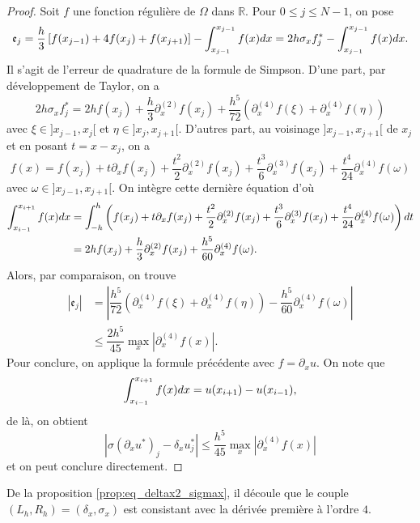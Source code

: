 \begin{itemize}
\begin{proof}
Soit $f$ une fonction régulière de $\Omega$ dans $\mathbb{R}$. Pour $0 \leq j \leq N-1$, on pose
\begin{equation}
\mathfrak{e}_j = \dfrac{h}{3} \left[ f(x_{j-1}) + 4 f(x_j) + f(x_{j+1}) \right] - \displaystyle\int_{x_{j-1}}^{x_{j-1}} f(x) dx = 2h \sigma_x f^*_j - \displaystyle\int_{x_{j-1}}^{x_{j-1}} f(x) dx.
\end{equation}
Il s'agit de l'erreur de quadrature de la formule de Simpson.
D'une part, par développement de Taylor, on a
\begin{equation}
2h \sigma_x f^*_j = 2h f(x_j) + \dfrac{h}{3}\partial_x^{(2)}f(x_j) + \dfrac{h^5}{72} \left( \partial_x^{(4)}f(\xi) + \partial_x^{(4)}f(\eta) \right) 
\end{equation}
avec $\xi \in ]x_{j-1}, x_j[$ et $\eta \in ]x_j, x_{j+1}[$.
D'autres part, au voisinage $]x_{j-1}, x_{j+1}[$ de $x_j$ et en posant $t=x-x_j$, on a 
\begin{equation}
f(x) = f(x_j) + t \partial_x f(x_j) + \dfrac{t^2}{2} \partial_x^{(2)} f(x_j) + \dfrac{t^3}{6} \partial_x^{(3)} f(x_j) + \dfrac{t^4}{24} \partial_x^{(4)} f(\omega)
\end{equation}
avec $\omega \in ]x_{j-1}, x_{j+1}[$. On intègre cette dernière équation d'où
\begin{align*}
\displaystyle\int_{x_{i-1}}^{x_{i+1}} f(x) dx & = \displaystyle\int_{-h}^h \left( f(x_j) + t \partial_x f(x_j) + \dfrac{t^2}{2} \partial_x^{(2)} f(x_j) + \dfrac{t^3}{6} \partial_x^{(3)} f(x_j) + \dfrac{t^4}{24} \partial_x^{(4)} f(\omega) \right) dt \\
	& = 2h f(x_j) + \dfrac{h}{3}\partial_x^{(2)}f(x_j) + \dfrac{h^5}{60}\partial_x^{(4)} f(\omega).
\end{align*}
Alors, par comparaison, on trouve
\begin{align*}
|\mathfrak{e}_j| & = |\dfrac{h^5}{72} \left( \partial_x^{(4)}f(\xi) + \partial_x^{(4)}f(\eta) \right)  - \dfrac{h^5}{60}\partial_x^{(4)} f(\omega)|  \\
	& \leq \dfrac{2 h^5}{45} \max_{x} |\partial_x^{(4)} f(x)|.
\end{align*}
Pour conclure, on applique la formule précédente avec $f = \partial_x u$. On note que 
\begin{equation}
\displaystyle\int_{x_{i-1}}^{x_{i+1}}f(x) dx = u(x_{i+1}) - u(x_{i-1}),
\end{equation}
de là, on obtient
\begin{equation}
|\sigma \left( \partial_x u^* \right)_j - \delta_x u^*_j | \leq \dfrac{h^5}{45}\max_{x} |\partial_x^{(4)} f(x)|
\end{equation}
et on peut conclure directement.
\end{proof}
De la proposition \ref{prop:eq_deltax2_sigmax}, il découle que le couple $(L_h, R_h) = (\delta_x, \sigma_x)$ est consistant avec la dérivée première à l'ordre $4$.
\end{itemize}

